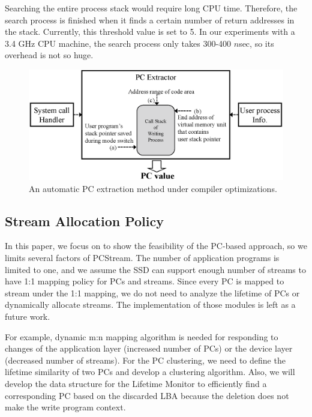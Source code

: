 Searching the entire process stack would require long CPU time. Therefore, the
search process is finished when it finds a certain number of return addresses
in the stack. Currently, this threshold value is set to 5.  In our experiments
with a 3.4 GHz CPU machine, the search process only takes 300-400 $n$sec, so
its overhead is not so huge.  

\begin{figure}[t]
	\centering
	\includegraphics[width=1\linewidth]{figure/getpc}
	\vspace{-10pt}
	\caption{An automatic PC extraction method under compiler optimizations.}
	\label{fig:getpc}
	\vspace{-20pt}
\end{figure}

\subsection{Stream Allocation Policy}
In this paper, we focus on to show the feasibility of the PC-based approach, 
so we limits several factors of PCStream.
The number of application programs is limited to one, 
and we assume the SSD can support enough number of streams
to have 1:1 mapping policy for PCs and streams.
Since every PC is mapped to stream under the 1:1 mapping, 
we do not need to analyze the lifetime of PCs 
or dynamically allocate streams.
The implementation of those modules 
is left as a future work. 

For example, dynamic m:n mapping algorithm is
needed for responding to changes of
the application layer (increased number of PCs)
or the device layer (decreased number of streams).
For the PC clustering, we need to define the lifetime similarity of two PCs
and develop a clustering algorithm.
Also, we will develop the data structure
for the Lifetime Monitor to efficiently find a corresponding PC 
based on the discarded LBA because the deletion does not
make the write program context.

